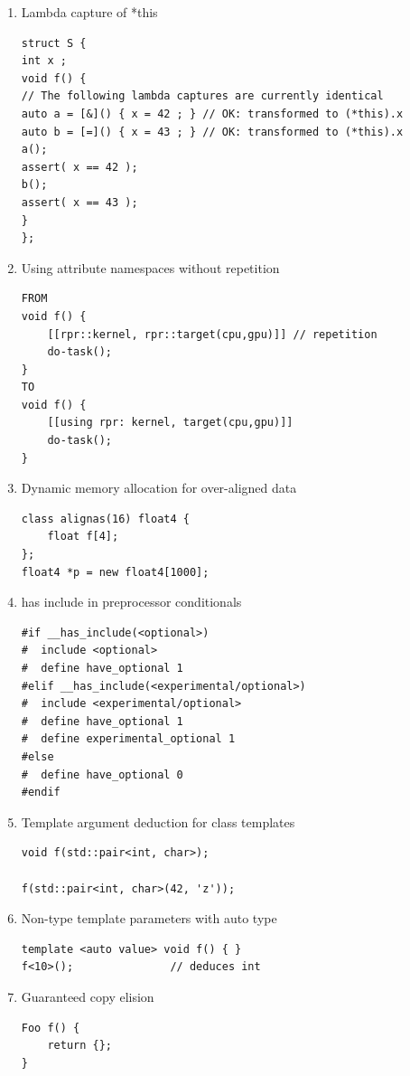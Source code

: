 \documentclass[12pt]{article}
\begin{document}
{\begin{enumerate}
\begin{lstlisting}
derived d1{{1, 2}, 3};      // full explicit initialization
derived d1{{}, 1};          // the base is value initialized
\end{lstlisting}
\item Lambda capture of *this
\begin{lstlisting}
struct S {
int x ;
void f() {
// The following lambda captures are currently identical
auto a = [&]() { x = 42 ; } // OK: transformed to (*this).x
auto b = [=]() { x = 43 ; } // OK: transformed to (*this).x
a();
assert( x == 42 );
b();
assert( x == 43 );
}
};
\end{lstlisting}
\item Using attribute namespaces without repetition
\begin{lstlisting}
FROM
void f() {
    [[rpr::kernel, rpr::target(cpu,gpu)]] // repetition
    do-task();
}
TO
void f() {
    [[using rpr: kernel, target(cpu,gpu)]]
    do-task();
}
\end{lstlisting}
\item Dynamic memory allocation for over-aligned data
\begin{lstlisting}
class alignas(16) float4 {
    float f[4];
};
float4 *p = new float4[1000];
\end{lstlisting}
\item has include in preprocessor conditionals
\begin{lstlisting}
#if __has_include(<optional>)
#  include <optional>
#  define have_optional 1
#elif __has_include(<experimental/optional>)
#  include <experimental/optional>
#  define have_optional 1
#  define experimental_optional 1
#else
#  define have_optional 0
#endif
\end{lstlisting}
\item Template argument deduction for class templates
\begin{lstlisting}
void f(std::pair<int, char>);

f(std::pair<int, char>(42, 'z'));
\end{lstlisting}
\item Non-type template parameters with auto type
\begin{lstlisting}
template <auto value> void f() { }
f<10>();               // deduces int
\end{lstlisting}
\item Guaranteed copy elision
\begin{lstlisting}
Foo f() {  
    return {};
}


\end{lstlisting}
\end{enumerate}}
\end{document}
